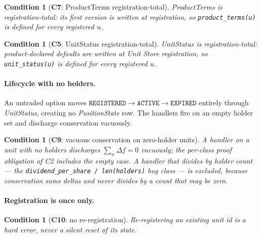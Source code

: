 \documentclass[11pt,a4paper]{article}
\newtheorem{condition}[definition]{Condition}
\begin{document}
\begin{condition}[\textbf{C7}: ProductTerms registration-total]
\emph{ProductTerms} is registration-total: its first version is written at registration, so
\texttt{product\_terms(u)} is defined for every registered $u$.
\end{condition}

\begin{condition}[\textbf{C5}: UnitStatus registration-total]
\emph{UnitStatus} is registration-total: product-declared defaults are written at Unit Store
registration, so \texttt{unit\_status(u)} is defined for every registered $u$.
\end{condition}

\paragraph{Lifecycle with no holders.}
An untraded option moves $\texttt{REGISTERED}\to\texttt{ACTIVE}\to\texttt{EXPIRED}$ entirely
through \emph{UnitStatus}, creating no \emph{PositionState} row. The handlers fire on an
empty holder set and discharge conservation vacuously.

\begin{condition}[\textbf{C9}: vacuous conservation on zero-holder units]
A handler on a unit with no holders discharges $\sum_w\Delta f=0$ vacuously; the per-class
proof obligation of C2 includes the empty case. A handler that divides by holder count ---
the \texttt{dividend\_per\_share / len(holders)} bug class --- is excluded, because
conservation sums deltas and never divides by a count that may be zero.
\end{condition}

\paragraph{Registration is once only.}
\begin{condition}[\textbf{C10}: no re-registration]
Re-registering an existing unit id is a hard error, never a silent reset of its state.
\end{condition}
\end{document}
